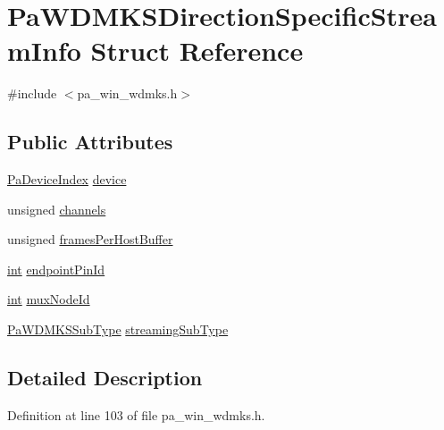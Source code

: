 \hypertarget{struct_pa_w_d_m_k_s_direction_specific_stream_info}{}\section{Pa\+W\+D\+M\+K\+S\+Direction\+Specific\+Stream\+Info Struct Reference}
\label{struct_pa_w_d_m_k_s_direction_specific_stream_info}


{\ttfamily \#include $<$pa\+\_\+win\+\_\+wdmks.\+h$>$}

\subsection*{Public Attributes}
\begin{DoxyCompactItemize}
\item 
\hyperlink{portaudio_8h_ad79317e65bde63d76c4b8e711ac5a361}{Pa\+Device\+Index} \hyperlink{struct_pa_w_d_m_k_s_direction_specific_stream_info_a37ff146054a9ae1c16b87f589874949a}{device}
\item 
unsigned \hyperlink{struct_pa_w_d_m_k_s_direction_specific_stream_info_a5bea6996e1aa45e8525769b13eca32a0}{channels}
\item 
unsigned \hyperlink{struct_pa_w_d_m_k_s_direction_specific_stream_info_a5b5248935d8b586285805bb827e1592f}{frames\+Per\+Host\+Buffer}
\item 
\hyperlink{xmltok_8h_a5a0d4a5641ce434f1d23533f2b2e6653}{int} \hyperlink{struct_pa_w_d_m_k_s_direction_specific_stream_info_a92bdda98baa8976a19d99da20eb6d21a}{endpoint\+Pin\+Id}
\item 
\hyperlink{xmltok_8h_a5a0d4a5641ce434f1d23533f2b2e6653}{int} \hyperlink{struct_pa_w_d_m_k_s_direction_specific_stream_info_ae4a79825046710f1fee6309b451983de}{mux\+Node\+Id}
\item 
\hyperlink{pa__win__wdmks_8h_ab1fecd3bd8c22ca5820fee46fc9d89c2}{Pa\+W\+D\+M\+K\+S\+Sub\+Type} \hyperlink{struct_pa_w_d_m_k_s_direction_specific_stream_info_a38c7069753a67167c66a926f7859d1f3}{streaming\+Sub\+Type}
\end{DoxyCompactItemize}


\subsection{Detailed Description}


Definition at line 103 of file pa\+\_\+win\+\_\+wdmks.\+h.



